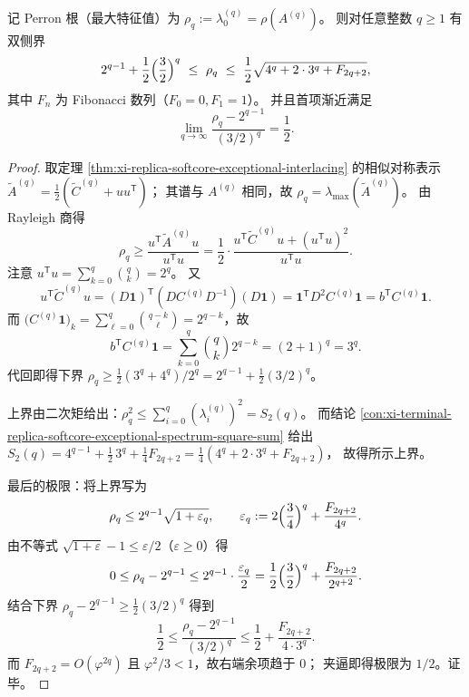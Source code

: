 \begin{theorem}\label{thm:xi-replica-softcore-perron-leading-term-bounds}
记 Perron 根（最大特征值）为 \(\rho_q:=\lambda_0^{(q)}=\rho(A^{(q)})\)。
则对任意整数 \(q\ge 1\) 有双侧界
\[
2^{q-1}+\frac12\Bigl(\frac32\Bigr)^{q}
\ \le\ \rho_q\ \le\
\frac12\sqrt{4^{q}+2\cdot 3^{q}+F_{2q+2}},
\]
其中 \(F_n\) 为 Fibonacci 数列（\(F_0=0,F_1=1\)）。
并且首项渐近满足
\[
\lim_{q\to\infty}\frac{\rho_q-2^{q-1}}{(3/2)^q}=\frac12.
\]
\end{theorem}
\begin{proof}
取定理 \ref{thm:xi-replica-softcore-exceptional-interlacing} 的相似对称表示
\(
\widetilde A^{(q)}=\frac12(\widetilde C^{(q)}+uu^{\mathsf T})
\)；
其谱与 \(A^{(q)}\) 相同，故 \(\rho_q=\lambda_{\max}(\widetilde A^{(q)})\)。
由 Rayleigh 商得
\[
\rho_q\ge \frac{u^{\mathsf T}\widetilde A^{(q)}u}{u^{\mathsf T}u}
=\frac12\cdot\frac{u^{\mathsf T}\widetilde C^{(q)}u+(u^{\mathsf T}u)^2}{u^{\mathsf T}u}.
\]
注意 \(u^{\mathsf T}u=\sum_{k=0}^{q}\binom{q}{k}=2^{q}\)。
又
\[
u^{\mathsf T}\widetilde C^{(q)}u
=(D\mathbf{1})^{\mathsf T}(DC^{(q)}D^{-1})(D\mathbf{1})
=\mathbf{1}^{\mathsf T}D^{2}C^{(q)}\mathbf{1}
=b^{\mathsf T}C^{(q)}\mathbf{1}.
\]
而 \(\bigl(C^{(q)}\mathbf{1}\bigr)_k=\sum_{\ell=0}^{q}\binom{q-k}{\ell}=2^{q-k}\)，故
\[
b^{\mathsf T}C^{(q)}\mathbf{1}
=\sum_{k=0}^{q}\binom{q}{k}2^{q-k}=(2+1)^{q}=3^{q}.
\]
代回即得下界
\(
\rho_q\ge \frac12(3^{q}+4^{q})/2^{q}=2^{q-1}+\frac12(3/2)^q
\)。
\par
上界由二次矩给出：\(\rho_q^2\le \sum_{i=0}^{q}(\lambda_i^{(q)})^2=S_2(q)\)。
而结论 \ref{con:xi-terminal-replica-softcore-exceptional-spectrum-square-sum} 给出
\(
S_2(q)=4^{q-1}+\frac12\,3^{q}+\frac14F_{2q+2}
=\frac14(4^{q}+2\cdot 3^{q}+F_{2q+2})
\)，
故得所示上界。
\par
最后的极限：将上界写为
\[
\rho_q\le 2^{q-1}\sqrt{1+\varepsilon_q},
\qquad
\varepsilon_q:=2\Bigl(\frac34\Bigr)^{q}+\frac{F_{2q+2}}{4^{q}}.
\]
由不等式 \(\sqrt{1+\varepsilon}-1\le \varepsilon/2\)（\(\varepsilon\ge 0\)）得
\[
0\le \rho_q-2^{q-1}
\le
2^{q-1}\cdot\frac{\varepsilon_q}{2}
=\frac12\Bigl(\frac32\Bigr)^{q}+\frac{F_{2q+2}}{2^{q+2}}.
\]
结合下界
\(
\rho_q-2^{q-1}\ge \frac12(3/2)^q
\)
得到
\[
\frac12
\le
\frac{\rho_q-2^{q-1}}{(3/2)^q}
\le
\frac12+\frac{F_{2q+2}}{4\cdot 3^q}.
\]
而 \(F_{2q+2}=O(\varphi^{2q})\) 且 \(\varphi^2/3<1\)，故右端余项趋于 \(0\)；
夹逼即得极限为 \(1/2\)。证毕。
\end{proof}

